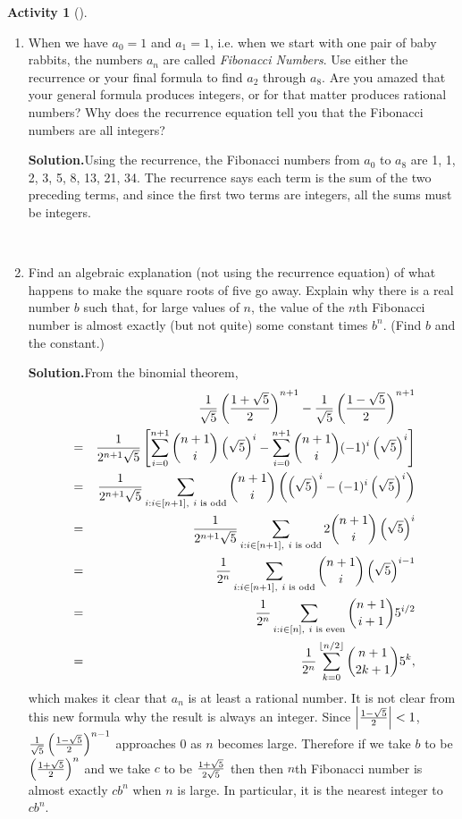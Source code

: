 \documentclass[10pt,]{book}
\theoremstyle{plain}
\theoremstyle{definition}
\newtheorem{activity}[project]{Activity}
\numberwithin{equation}{chapter}
\newcommand{\lt}{<}
\newcommand{\amp}{&}
\begin{document}
\begin{activity}[]
\begin{enumerate}[label=(\alph*)]
~\par
\item When we have \(a_0=1\) and \(a_1=1\), i.e. when we start with one pair of baby rabbits, the numbers \(a_n\) are called \emph{Fibonacci Numbers}.  Use either the recurrence or your final formula to find \(a_2\) through \(a_8\).  Are you amazed that your general formula produces integers, or for that matter produces rational numbers?  Why does the recurrence equation tell you that the Fibonacci numbers are all integers?%
\par\medskip\noindent%
\textbf{Solution.}\quad Using the recurrence, the Fibonacci numbers from \(a_0\) to \(a_8\) are 1, 1, 2, 3, 5, 8, 13, 21, 34. The recurrence says each term is the sum of the two preceding terms, and since the first two terms are integers, all the sums must be integers.%

~\par
\item Find an algebraic explanation (not using the recurrence equation) of what happens to make the square roots of five go away. Explain why there is a real number \(b\) such that, for large values of \(n\), the value of the \(n\)th Fibonacci number is almost exactly (but not quite) some constant times \(b^n\).  (Find \(b\) and the constant.)%
\par\medskip\noindent%
\textbf{Solution.}\quad From the binomial theorem,%
\begin{align*}
\amp \amp \frac{1}{\sqrt{5}}\left({1+\sqrt{5}\over
2}\right)^{n+1}- \frac{1}{\sqrt{5}}\left({1-\sqrt{5}
\over2}\right)^{n+1}\\
\amp =\amp 
\frac{1}{2^{n+1}\sqrt{5}}\left[\sum_{i=0}^{n+1}\binom{n+1}{i}\left(\sqrt{5}\right)^i -\sum_{i=0}^{n+1} \binom{n+1}{i}(-1)^i\left(\sqrt{5}\right)^i\right]\\
\amp =\amp \frac{1}{2^{n+1}\sqrt{5}}\sum_{i:i\in
[n+1],\ i\mbox{\scriptsize~is odd} }\binom{n+1}{i}\left(\left(\sqrt{5}\right)^i
-(-1)^i\left(\sqrt{5}\right)^i\right)\\
\amp =\amp \frac{1}{2^{n+1}\sqrt{5}}\sum_{i:i\in[n+1],\ i\mbox{\scriptsize~is
odd} }  2\binom{n+1}{i}\left(\sqrt{5}\right)^i\\
\amp =\amp \frac{1}{2^{n}}\sum_{i:i\in[n+1],\ i\mbox{\scriptsize~is
odd} }  \binom{n+1}{i}\left(\sqrt{5}\right)^{i-1}\\
\amp =\amp \frac{1}{2^{n}}\sum_{i:i\in[n],\ i\mbox{\scriptsize~is
even} }  \binom{n+1}{i+1}5^{i/2}\\
\amp =\amp \frac{1}{2^n}\sum_{k=0}^{\lfloor n/2 \rfloor}\binom{n+1}{2k+1}5^k,
\end{align*}
which makes it clear that \(a_n\) is at least a rational number. It is not clear from this new formula why the result is always an integer. Since \(\left|{1-\sqrt{5}\over 2}\right|\lt 1\), \(\frac{1}{\sqrt{5}}\left({1-\sqrt{5}\over 2}\right)^{n-1}\) approaches 0 as \(n\) becomes large. Therefore if we take \(b\) to be \(\left({1+\sqrt{5}\over
2}\right)^n\) and we take \(c\) to be \({1+\sqrt{5}\over 2\sqrt{5}}\) then then \(n\)th Fibonacci number is almost exactly \(cb^n\) when \(n\) is large. In particular, it is the nearest integer to \(cb^n\).%


\end{enumerate}
\end{activity}
\end{document}
